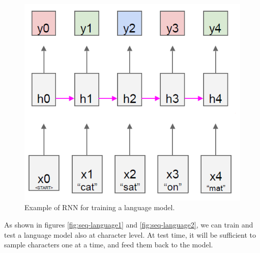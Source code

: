 \begin{figure}[h!]
    \centering
    \includegraphics[width=0.3\linewidth]{images/seq-language}
    \caption[Example of RNN for training a language model.]{Example of RNN for training a language model.}
    \label{fig:seq-language}
\end{figure}

As shown in figures \ref{fig:seq-language1} and \ref{fig:seq-language2}, we can train and test a language model also at character level. At test time, it will be sufficient to sample characters one at a time, and feed them back to the model.


